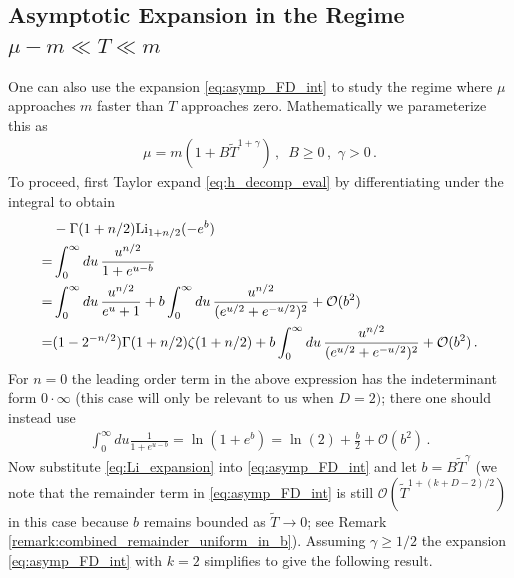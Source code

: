 \documentclass[sn-mathphys,Numbered]{sn-jnl}
\begin{document}
\subsection{Asymptotic Expansion in the Regime $\mu-m\ll T\ll m$}\label{sec:decaying_b}
One can also use the expansion \eqref{eq:asymp_FD_int} to study the regime where $\mu$ approaches $m$ faster than $T$ approaches zero. Mathematically we parameterize this as 
\begin{align}\label{eq:mu_decay_faster}
\mu=m(1+B\widetilde{T}^{1+\gamma})\,,\,\,\,  B\geq 0\,,\,\, \gamma>0\,.   
\end{align}
  To proceed, first  Taylor expand \eqref{eq:h_decomp_eval} by differentiating under the integral to obtain
\begin{align}\label{eq:Li_expansion}
    &-\Gamma(1+n/2)\mathrm{Li}_{1+n/2}(-e^b)\\
    =&\int_0^\infty du \, \frac{u^{n/2}}{1+e^{u-b}}    \notag\\
    =&\int_0^\infty du\,\frac{u^{n/2}}{e^u+1}+b\int_0^\infty du\,\frac{u^{n/2}}{(e^{u/2}+e^{-u/2})^2}  +\mathcal{O}(b^2)\notag\\
    =&(1 - 2^{-n/2}) \Gamma(1 + n/2) \zeta(1 + n/2)+ b\int_0^\infty du\,\frac{u^{n/2}}{(e^{u/2}+e^{-u/2})^2} +\mathcal{O}(b^2)\,.\notag
\end{align}
For $n=0$ the leading order term in the above expression has the indeterminant form $0\cdot \infty$ (this case will only be  relevant to us when $D=2)$; there one should instead use
\begin{align}
\int_0^\infty du \frac{1}{1+e^{u-b}}=\ln(1+e^b)=    \ln(2)+\frac{b}{2}+\mathcal{O}(b^2)\,.
\end{align}
Now substitute \eqref{eq:Li_expansion} into \eqref{eq:asymp_FD_int} and let $b=B\widetilde{T}^\gamma$ (we note that the remainder term in \eqref{eq:asymp_FD_int} is still $\mathcal{O}(\widetilde{T}^{1+(k+D-2)/2})$ in this case because $b$ remains bounded as $\widetilde{T}\to 0$; see Remark \ref{remark:combined_remainder_uniform_in_b}). Assuming $\gamma\geq 1/2$  the expansion \eqref{eq:asymp_FD_int} with $k=2$ simplifies to give the following result.
\end{document}
